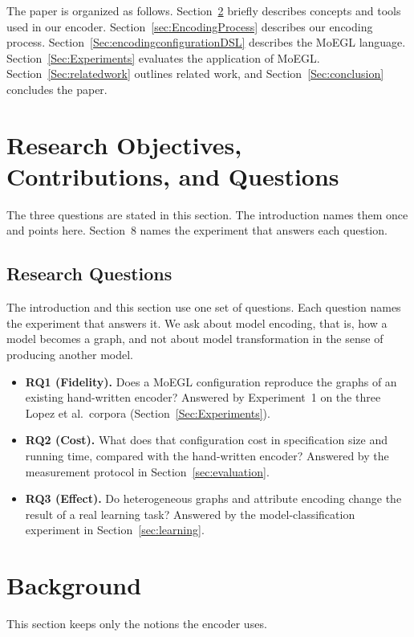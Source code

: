 \documentclass[journal,article,submit,moreauthors,technologies]{Definitions/mdpi}
\newcommand{\rev}[1]{#1}
\begin{document}
The paper is organized as follows. Section~\ref{Sec:background} briefly describes concepts and tools used in our encoder. Section~\ref{sec:EncodingProcess} describes our encoding process. Section~\ref{Sec:encodingconfigurationDSL} describes the MoEGL language. Section~\ref{Sec:Experiments} evaluates the application of MoEGL. Section~\ref{Sec:relatedwork} outlines related work, and Section~\ref{Sec:conclusion} concludes the paper.

\section{Research Objectives, Contributions, and Questions}
\rev{The three questions are stated in this section. The introduction names them once and points here. Section~8 names the experiment that answers each question.}

\subsection{Research Questions}\label{sec:rqs}
\rev{The introduction and this section use one set of questions. Each question names the experiment that answers it. We ask about model encoding, that is, how a model becomes a graph, and not about model transformation in the sense of producing another model.}
\begin{itemize}
    \item \rev{\textbf{RQ1 (Fidelity).} Does a MoEGL configuration reproduce the graphs of an existing hand-written encoder? Answered by Experiment~1 on the three Lopez et al.\ corpora (Section~\ref{Sec:Experiments}).}
    \item \rev{\textbf{RQ2 (Cost).} What does that configuration cost in specification size and running time, compared with the hand-written encoder? Answered by the measurement protocol in Section~\ref{sec:evaluation}.}
    \item \rev{\textbf{RQ3 (Effect).} Do heterogeneous graphs and attribute encoding change the result of a real learning task? Answered by the model-classification experiment in Section~\ref{sec:learning}.}
\end{itemize}



\section{Background} \label{Sec:background}
\rev{This section keeps only the notions the encoder uses.}
\end{document}
